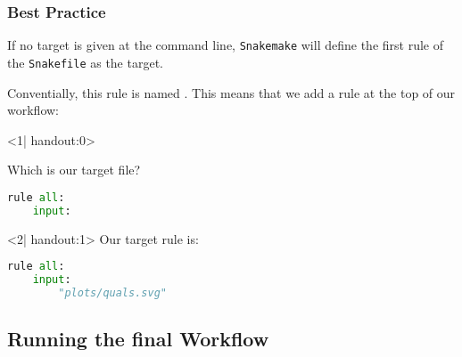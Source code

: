 \begin{frame}[fragile]
  \frametitle{Best Practice}
  \begin{docs}
  	If no target is given at the command line, \texttt{Snakemake} will define the first rule of the \texttt{Snakefile} as the target.
  \end{docs}
  Conventially, this rule is named . This means that we add a rule at the top of our workflow:\newline
  \begin{onlyenv}<1| handout:0>
   \begin{question}
   	  Which is our target file?
   \end{question}
   \begin{lstlisting}[language=Python,style=Python]
 rule all:
    input: 
   \end{lstlisting}
  \end{onlyenv}
  \begin{onlyenv}<2| handout:1>
   Our target rule is:
   \begin{lstlisting}[language=Python,style=Python]
 rule all:
    input: 
        "plots/quals.svg"
   \end{lstlisting}
  \end{onlyenv}
\end{frame}

\subsection{Running the final Workflow}

